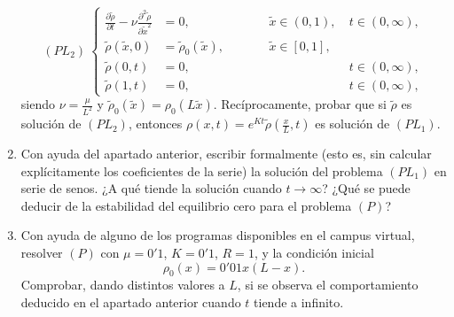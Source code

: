 \documentclass[11pt]{report}
\begin{document}
\begin{exercise}[Junio de 2021]
\begin{enumerate}
        \[(PL_2) \ \left\{\begin{alignedat}{4}
        \frac{\partial \widetilde{\rho}}{\partial t}-\nu\frac{\partial^2\widetilde{\rho}}{\partial \widetilde{x}^2} &= 0, & \qquad & \widetilde{x} \in (0,1), \ & t \in (0,\infty), \\
        \widetilde{\rho}(\widetilde{x},0) &= \widetilde{\rho}_0(\widetilde{x}), & \qquad & \widetilde{x} \in [0,1], & \\
        \widetilde{\rho}(0,t) &= 0, & \qquad & \ & t \in (0,\infty), \\
        \widetilde{\rho}(1,t) &= 0, & \qquad & \ & t \in (0,\infty),
        \end{alignedat}\right.\]
        siendo $\nu = \frac{\mu}{L^2}$ y $\widetilde{\rho}_0(\widetilde{x}) = \rho_0(L\widetilde{x})$. Recíprocamente, probar que si $\widetilde{\rho}$ es solución de $(PL_2)$, entonces $\rho(x,t) = e^{Kt}\widetilde{\rho}(\frac{x}{L},t)$ es solución de $(PL_1)$.
        \item Con ayuda del apartado anterior, escribir formalmente (esto es, sin calcular explícitamente los coeficientes de la serie) la solución del problema $(PL_1)$ en serie de senos. ¿A qué tiende la solución cuando $t\to\infty$? ¿Qué se puede deducir de la estabilidad del equilibrio cero para el problema $(P)$?
        \item Con ayuda de alguno de los programas disponibles en el campus virtual, resolver $(P)$ con $\mu = 0'1$, $K = 0'1$, $R = 1$, y la condición inicial
        \[\rho_0(x) = 0'01x(L-x).\]
        Comprobar, dando distintos valores a $L$, si se observa el comportamiento deducido en el apartado anterior cuando $t$ tiende a infinito.
    \end{enumerate}
\end{exercise}
\end{document}
